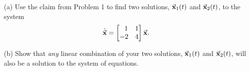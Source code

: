 \documentclass[epsf]{article}
\begin{document}
\newpage

 (a) Use the claim from Problem 1 to find two solutions, $\vec{\bf x}_1(t)$ and $\vec{\bf x}_2(t)$, to the system
$$\dot{\vec{\mathbf{ x}}} = \begin{bmatrix}\ \ 1 & 1 \cr -2 & 4  \end{bmatrix}\vec{\mathbf{x}}.$$ 
\vskip 3in

\noi (b) Show that \textit{any} linear combination of your two solutions, $\vec{\bf x}_1(t)$ and $\vec{\bf x}_2(t)$, will also be a solution to the system of equations.
\end{document}
